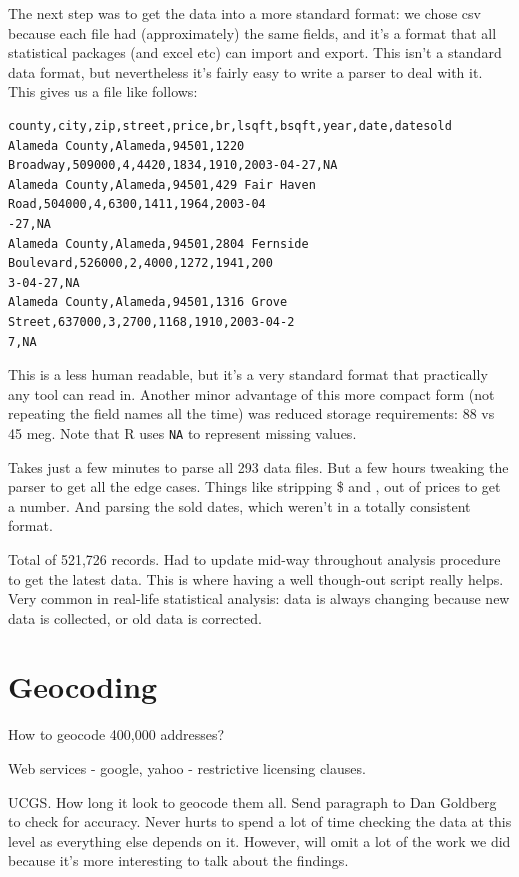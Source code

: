 \documentclass[oneside]{article}
\begin{document}
The next step was to get the data into a more standard format: we chose csv because each file had (approximately) the same fields, and it's a format that all statistical packages (and excel etc) can import and export.  This isn't a standard data format, but nevertheless it's fairly easy to write a parser to deal with it.  This gives us a file like follows:

\begin{verbatim}
county,city,zip,street,price,br,lsqft,bsqft,year,date,datesold
Alameda County,Alameda,94501,1220 Broadway,509000,4,4420,1834,1910,2003-04-27,NA
Alameda County,Alameda,94501,429 Fair Haven Road,504000,4,6300,1411,1964,2003-04
-27,NA
Alameda County,Alameda,94501,2804 Fernside Boulevard,526000,2,4000,1272,1941,200
3-04-27,NA
Alameda County,Alameda,94501,1316 Grove Street,637000,3,2700,1168,1910,2003-04-2
7,NA
\end{verbatim}

This is a less human readable, but it's a very standard format that practically any tool can read in.  Another minor advantage of this more compact form (not repeating the field names all the time) was reduced storage requirements: 88 vs 45 meg.  Note that R uses {\tt NA} to represent missing values.

Takes just a few minutes to parse all 293 data files.  But a few hours tweaking the parser to get all the edge cases.  Things like stripping \$ and , out of prices to get a number.  And parsing the sold dates, which weren't in a totally consistent format.

Total of 521,726 records.  Had to update mid-way throughout analysis procedure to get the latest data.  This is where having a well though-out script really helps.  Very common in real-life statistical analysis: data is always changing because new data is collected, or old data is corrected.  

\section{Geocoding} 

How to geocode 400,000 addresses?  

Web services - google, yahoo - restrictive licensing clauses.

UCGS.  How long it look to geocode them all.  Send paragraph to Dan Goldberg to check for accuracy.  Never hurts to spend a lot of time checking the data at this level as everything else depends on it.  However, will omit a lot of the work we did because it's more interesting to talk about the findings.
\end{document}
